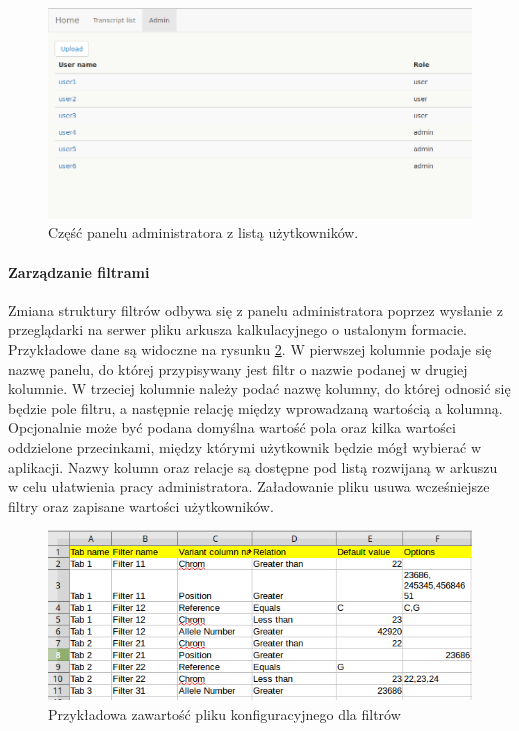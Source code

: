 \documentclass[a4paper,12pt,twoside]{article}
\begin{document}
\begin{figure}[h]
\centering
\includegraphics[width=\textwidth]{obrazy/aplikacja/admin.png}
\caption{Część panelu administratora z listą użytkowników.}
\label{fig:adminpic}
\end{figure}

\newpage
\paragraph{Zarządzanie filtrami}

Zmiana struktury filtrów odbywa się z panelu administratora poprzez wysłanie
z przeglądarki na serwer pliku arkusza kalkulacyjnego o ustalonym formacie. Przykładowe dane są widoczne na rysunku \ref{fig:input_filepic}.
W pierwszej kolumnie podaje się nazwę panelu, do której przypisywany
jest filtr o nazwie podanej w drugiej kolumnie. W trzeciej kolumnie należy podać nazwę kolumny, do której
odnosić się będzie pole filtru, a następnie relację między wprowadzaną wartością a kolumną.
Opcjonalnie może być podana domyślna wartość pola oraz kilka wartości oddzielone przecinkami, między którymi użytkownik będzie mógł wybierać w aplikacji. Nazwy kolumn oraz relacje są dostępne pod
listą rozwijaną w arkuszu w celu ułatwienia pracy administratora.
Załadowanie pliku usuwa wcześniejsze filtry oraz zapisane wartości użytkowników.

\begin{figure}[h!]
\centering
\includegraphics[width=\textwidth]{obrazy/aplikacja/input_file.png}
\caption{Przykładowa zawartość pliku konfiguracyjnego dla filtrów}
\label{fig:input_filepic}
\end{figure}
\end{document}
